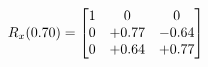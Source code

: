 \documentclass[preview]{standalone}
\begin{document}
\begin{align*}
\special{dvisvgm:raw <g id='unique000'>}R_{x}(0.70) = \begin{bmatrix}1 & 0 & 0 \\0 & +0.77 & -0.64 \\0 & +0.64 & +0.77\end{bmatrix}\special{dvisvgm:raw </g>}
\end{align*}
\end{document}
